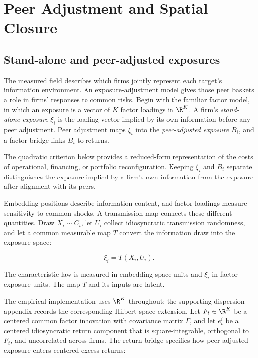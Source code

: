 \section{Peer Adjustment and Spatial Closure}\label{sec:spatial-closure}

\subsection{Stand-alone and peer-adjusted exposures}\label{sec:model}

The measured field describes which firms jointly represent each target's
information environment.
An exposure-adjustment model gives those peer baskets a role in firms'
responses to common risks.
Begin with the familiar factor model, in which an exposure is a vector of $K$
factor loadings in $\R^K$.
A firm's \emph{stand-alone exposure} $\xi_i$ is the loading vector implied by
its own information before any peer adjustment.
Peer adjustment maps $\xi_i$ into the \emph{peer-adjusted exposure} $B_i$, and
a factor bridge links $B_i$ to returns.

The quadratic criterion below provides a reduced-form representation of the
costs of operational, financing, or portfolio reconfiguration.
Keeping $\xi_i$ and $B_i$ separate distinguishes the exposure implied by a
firm's own information from the exposure after alignment with its peers.

Embedding positions describe information content, and factor loadings measure
sensitivity to common shocks.
A transmission map connects these different quantities.
Draw $X_i\sim C_i$, let $U_i$ collect idiosyncratic transmission randomness, and
let a common measurable map $T$ convert the information draw into the exposure
space:

\begin{equation}\label{eq:primitive-exposure}
  \xi_i = T(X_i,U_i).
\end{equation}

The characteristic law is measured in embedding-space units and $\xi_i$ in
factor-exposure units.
The map $T$ and its inputs are latent.

The empirical implementation uses $\R^K$ throughout; the supporting dispersion
appendix records the corresponding Hilbert-space extension.
Let $F_t\in\R^K$ be a centered common factor innovation with covariance matrix
$\Gamma$, and let $e_t^i$ be a centered idiosyncratic return component
that is square-integrable, orthogonal to $F_t$, and uncorrelated across firms.
The return bridge specifies how peer-adjusted exposure enters centered excess
returns:

